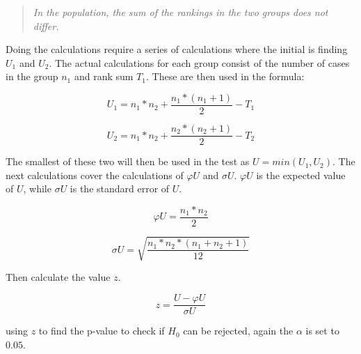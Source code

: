 \begin{quote}
    \textit{In the population, the sum of the rankings in the two groups does not differ.}
\end{quote}

Doing the calculations require a series of calculations where the initial is finding $U_1$ and $U_2$. The actual calculations for each group consist of the number of cases in the group $n_1$ and rank sum $T_1$. These are then used in the formula:

\begin{equation}
    U_1 = n_1*n_2+\frac{n_1*(n_1+1)}{2}-T_1  
\end{equation}

\begin{equation}
    U_2 = n_1*n_2+\frac{n_2*(n_2+1)}{2}-T_2
\end{equation}

The smallest of these two will then be used in the test as $U=min(U_1,U_2)$. The next calculations cover the calculations of $\varphi U$ and $\sigma U$. $\varphi U$ is the expected value of $U$, while $\sigma U$ is the standard error of $U$.

\begin{equation}
    \varphi U = \frac{n_1*n_2}{2}
\end{equation}

\begin{equation}
    \sigma U = \sqrt{\frac{n_1*n_2*(n_1+n_2+1)}{12}}
\end{equation}

Then calculate the value $z$.

\begin{equation}
    z = \frac{U-\varphi U}{\sigma U}
\end{equation}

using $z$ to find the p-value to check if $H_0$ can be rejected, again the $\alpha$ is set to $0.05$. 

